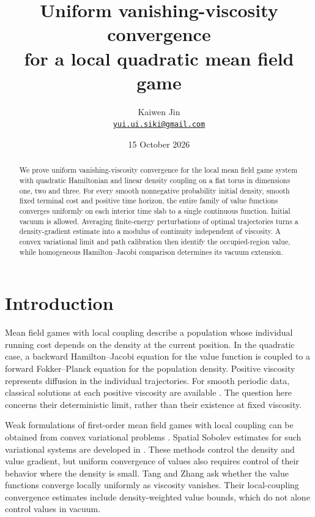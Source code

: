 \documentclass[11pt]{article}
\title{Uniform vanishing-viscosity convergence\\
for a local quadratic mean field game}
\author{Kaiwen Jin\\[2mm]
\small\href{mailto:yui.ui.siki@gmail.com}{\texttt{yui.ui.siki@gmail.com}}}
\date{15 October 2026}
\numberwithin{equation}{section}
\begin{document}
\maketitle

\begin{abstract}
We prove uniform vanishing-viscosity convergence for the local mean field
game system with quadratic Hamiltonian and linear density coupling on a
flat torus in dimensions one, two and three. For every smooth nonnegative
probability initial density, smooth fixed terminal cost and positive
time horizon, the entire family of value functions converges uniformly
on each interior time slab to a single continuous function.
Initial vacuum is allowed. Averaging finite-energy perturbations of
optimal trajectories turns a density-gradient estimate into a modulus
of continuity independent of viscosity. A convex variational limit and
path calibration then identify the occupied-region value, while
homogeneous Hamilton--Jacobi comparison determines its vacuum extension.
\end{abstract}

\section{Introduction}\label{sec:intro}

Mean field games with local coupling describe a population whose individual
running cost depends on the density at the current position. In the
quadratic case, a backward Hamilton--Jacobi equation for the value function
is coupled to a forward Fokker--Planck equation for the population density.
Positive viscosity represents diffusion in the individual trajectories.
For smooth periodic data, classical solutions at each positive viscosity
are available \cite[Theorem~4.1]{CLLP}. The question here concerns their
deterministic limit, rather than their existence at fixed viscosity.

Weak formulations of first-order mean field games with local coupling
can be obtained from convex variational problems \cite{Cardaliaguet}.
Spatial Sobolev estimates for such variational systems are developed in
\cite{GraberMeszaros}. These methods control the density and value
gradient, but uniform convergence of values also requires control of
their behavior where the density is small. Tang and Zhang
\cite[Section~7, problem~2(a)]{TangZhang} ask whether the value
functions converge locally uniformly as viscosity vanishes. Their
local-coupling convergence estimates include density-weighted value
bounds, which do not alone control values in vacuum.
\end{document}

